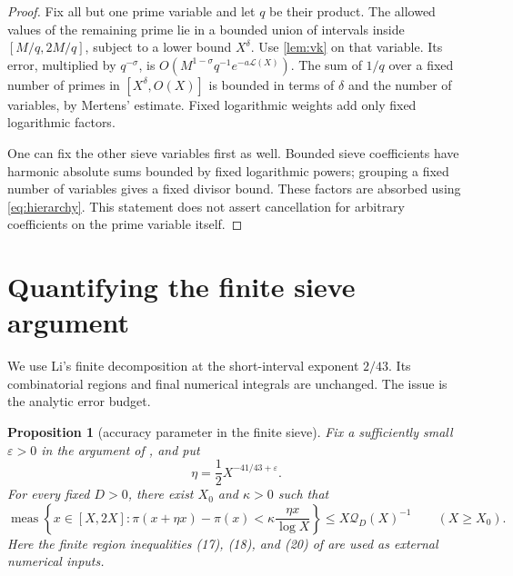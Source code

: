 \documentclass[11pt,a4paper]{article}
\newtheorem{proposition}[theorem]{Proposition}
\theoremstyle{remark}
\newcommand{\meas}{\operatorname{meas}}
\newcommand{\Q}{\mathcal Q}
\newcommand{\LL}{\mathcal L}
\newcommand{\eps}{\varepsilon}
\begin{document}
\begin{proof}
Fix all but one prime variable and let $q$ be their product.
The allowed values of the remaining prime lie in a bounded union of
intervals inside $[M/q,2M/q]$, subject to a lower bound $X^\delta$.
Use \cref{lem:vk} on that variable. Its error, multiplied by $q^{-\sigma}$,
is $O(M^{1-\sigma}q^{-1}e^{-a\LL(X)})$.
The sum of $1/q$ over a fixed number of primes in $[X^\delta,O(X)]$ is
bounded in terms of $\delta$ and the number of variables, by Mertens'
estimate. Fixed logarithmic weights add only fixed logarithmic factors.

One can fix the other sieve variables first as well. Bounded sieve
coefficients have harmonic absolute sums bounded by fixed logarithmic
powers; grouping a fixed number of variables gives a fixed divisor
bound. These factors are absorbed using \eqref{eq:hierarchy}.
This statement does not assert cancellation for arbitrary coefficients
on the prime variable itself.
\end{proof}

\section{Quantifying the finite sieve argument}\label{sec:sieve}

We use Li's finite decomposition at the short-interval exponent $2/43$.
Its combinatorial regions and final numerical integrals are unchanged.
The issue is the analytic error budget.

\begin{proposition}[accuracy parameter in the finite sieve]\label{prop:finiteQ}
Fix a sufficiently small $\eps>0$ in the argument of \cite{LiI}, and put
\[
            \eta=\frac12X^{-41/43+\eps}.
\]
For every fixed $D>0$, there exist $X_0$ and $\kappa>0$ such that
\begin{equation}\label{eq:sieveQ}
 \meas\left\{x\in[X,2X]:
   \pi(x+\eta x)-\pi(x)<\kappa\frac{\eta x}{\log X}\right\}
 \le X\Q_D(X)^{-1}
 \qquad (X\ge X_0).
\end{equation}
Here the finite region inequalities (17), (18), and (20) of \cite{LiI}
are used as external numerical inputs.
\end{proposition}
\end{document}
